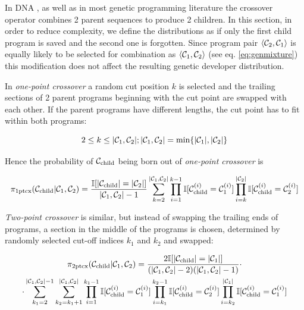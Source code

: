 In DNA \cite{evocritique}, as well as in most genetic programming literature \cite{genprog1,genprog2} the crossover operator combines 2 parent sequences to produce 2 children.
In this section, in order to reduce complexity, we define the distributions as if only the first child program is saved and the second one is forgotten.
Since program pair $\langle \mathcal{C}_2, \mathcal{C}_1 \rangle$ is equally likely to be selected for combination as $\langle \mathcal{C}_1, \mathcal{C}_2 \rangle$ (see eq. \ref{eq:genmixture}) this modification does not affect the resulting genetic developer distribution.

In \emph{one-point crossover} a random cut position $k$ is selected and the trailing sections of 2 parent programs beginning with the cut point are swapped with each other. 
If the parent programs have different lengths, the cut point has to fit within both programs:

\begin{equation}
    2 \leq k \leq |\mathcal{C}_1,\mathcal{C}_2|; |\mathcal{C}_1,\mathcal{C}_2| = \min\{|\mathcal{C}_1|, |\mathcal{C}_2|\}
\end{equation}

Hence the probability of $\mathcal{C}_\text{child}$ being born out of \emph{one-point crossover} is

\begin{equation}
    \pi_\text{1ptcx}(\mathcal{C}_\text{child}|\mathcal{C}_1,\mathcal{C}_2) =
        \frac{\mathbb{I}[|\mathcal{C}_\text{child}|=|\mathcal{C}_2|]}{|\mathcal{C}_1,\mathcal{C}_2|-1}
        \sum\limits_{k=2}^{|\mathcal{C}_1,\mathcal{C}_2|} \prod\limits_{i=1}^{k-1} \mathbb{I}[\mathcal{C}_\text{child}^{(i)} = \mathcal{C}_1^{(i)}] \prod\limits_{i=k}^{|\mathcal{C}_2|} \mathbb{I}[\mathcal{C}_\text{child}^{(i)} = \mathcal{C}_2^{(i)}]
\end{equation}

\emph{Two-point crossover} is similar, but instead of swapping the trailing ends of programs, a section in the middle of the programs is chosen, determined by randomly selected cut-off indices $k_1$ and $k_2$ and swapped:

\begin{multline}
    \pi_\text{2ptcx}(\mathcal{C}_\text{child}|\mathcal{C}_1,\mathcal{C}_2) =
        \frac{2 \mathbb{I}[|\mathcal{C}_\text{child}|=|\mathcal{C}_1|]}{(|\mathcal{C}_1,\mathcal{C}_2|-2)(|\mathcal{C}_1,\mathcal{C}_2|-1)} 
        \cdot \\ \cdot
        \sum\limits_{k_1=2}^{|\mathcal{C}_1,\mathcal{C}_2|-1}
        \sum\limits_{k_2=k_1+1}^{|\mathcal{C}_1,\mathcal{C}_2|} 
        \prod\limits_{i=1}^{k_1-1} \mathbb{I}[\mathcal{C}_\text{child}^{(i)} = \mathcal{C}_1^{(i)}] \prod\limits_{i=k_1}^{k_2-1} \mathbb{I}[\mathcal{C}_\text{child}^{(i)} = \mathcal{C}_2^{(i)}]
        \prod\limits_{i=k_2}^{|\mathcal{C}_1|} \mathbb{I}[\mathcal{C}_\text{child}^{(i)} = \mathcal{C}_1^{(i)}]
\end{multline}

